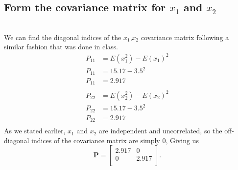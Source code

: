 \documentclass[12pt,letterpaper, onecolumn]{exam}
\begin{document}
\begin{questions}
\begin{parts}
            \part{Form the covariance matrix for $x_1$ and $x_2$}\\
                \solution
                    We can find the diagonal indices of the $x_1$,$x_2$ covariance matrix following a similar fashion that was done in class.
                    \begin{equation}\begin{split}\label{eq:9}
                        P_{11} & = E(x_1^2) - E(x_1)^2\\
                        P_{11} & = 15.17 - 3.5^2\\
                        P_{11} & = 2.917\\
                    \end{split}\end{equation}
                    \begin{equation}\begin{split}
                        P_{22} & = E(x_2^2) - E(x_2)^2\\
                        P_{22} & = 15.17 - 3.5^2\\
                        P_{22} & = 2.917\\
                    \end{split}\end{equation}
                    As we stated earlier, $x_1$ and $x_2$ are independent and uncorrelated, so the off-diagonal indices of the covariance matrix are simply 0, Giving us 
                    \[\mathbf{P} = 
                    \begin{bmatrix}
                        2.917 & 0\\
                        0 & 2.917\\
                    \end{bmatrix}.\]
                    

\end{parts}
\end{questions}
\end{document}
